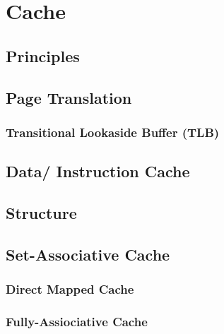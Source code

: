 \section{Cache}
\subsection{Principles}
\subsection{Page Translation}
\subsubsection{Transitional Lookaside Buffer (TLB)}
\subsection{Data/ Instruction Cache}
\subsection{Structure}
\subsection{Set-Associative Cache}
\subsubsection{Direct Mapped Cache}
\subsubsection{Fully-Assiociative Cache}